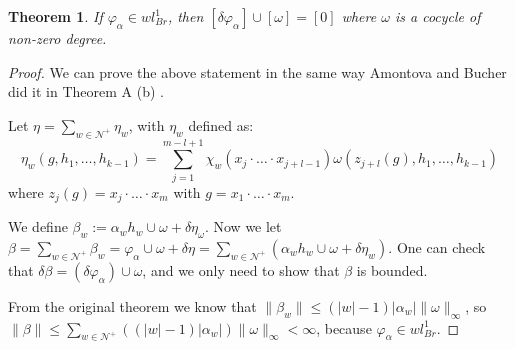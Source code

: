 \documentclass[leqno]{article}
\newtheorem*{theorem}{Theorem}
\newtheorem*{lemma}{Lemma}
\begin{document}
\begin{theorem} If $\varphi _\alpha \in wl^1_{Br}$, then $[\delta \varphi _\alpha ]\cup [\omega] =[0]$ where $\omega$ is a cocycle of non-zero degree.
\end{theorem}
\begin{proof}
  We can prove the above statement in the same way Amontova and Bucher did it in Theorem A (b) \cite{amontova}.

Let $\eta = \sum_{w\in \mathcal{N}^+}\eta_w$, with $\eta_w$ defined as:
\[
  \eta_w (g, h_1, \ldots, h_{k-1}) = \sum_{j=1}^{m-l+1} \chi _w (x_j\cdot \ldots\cdot x_{j+l-1})\omega (z_{j+l}(g), h_1, \ldots, h_{k-1})
\] 
where $z_j(g)=x_j \cdot  \ldots \cdot x_m$ with $g = x_1\cdot \ldots \cdot x_m$.

We define $\beta _w := \alpha _wh_w\cup \omega +\delta \eta_\omega $. Now we let $\beta = \sum_{w\in \mathcal{N}^+} \beta _w = \varphi_\alpha \cup \omega +\delta \eta = \sum_{w\in \mathcal{N}^+}\left( \alpha _w h_w \cup \omega +\delta\eta_w \right)$. One can check that $\delta \beta = (\delta \varphi _\alpha )\cup \omega $, and we only need to show that $\beta $ is bounded.

From the original theorem we know that $\|\beta _w\| \le (|w|-1)|\alpha _w |\|\omega \|_{\infty}$, so $\|\beta \|\le \sum_{w\in \mathcal{N}^+}((|w|-1)|\alpha _w|)\|\omega \|_{\infty}<\infty$, because $\varphi _\alpha \in wl^1_{Br}$.
\end{proof}

\begin{comment}
\section{Some properties of cocycles}

\begin{lemma} Let  $k>0$ even. Then if  $\omega \in C^k(F, \mathbb{R})$ is a cocycle, $\lambda := \omega + A$, with $A\in \mathbb{R}$ is also a cocycle.
\end{lemma}
\begin{proof} 
  \begin{align*}
	&\delta \lambda (h_1, \ldots, h_{k+1}) = \lambda(h_2,\ldots,h_{k+1}) + \sum _{j=1}^k \lambda (h_1, \ldots, h_jh_{j+1}, \ldots, h(k+1)) - \lambda(h_1, \ldots, h_k) =  \\
	&= \omega (h_2,\ldots,h_{k+1}) + A + \sum _{j=1}^k( \omega (h_1, \ldots, h_jh_{j+1}, \ldots, h(k+1))+A) - \omega (h_1, \ldots, h_k) -A = \delta \omega (h_1, \ldots, h_{k+1}) = 0
  \end{align*}
\end{proof}
\end{comment}




\end{document}
